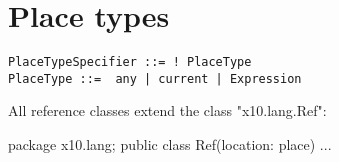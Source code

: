 

\section{Place types}\label{DepType:PlaceType}

\begin{verbatim}
PlaceTypeSpecifier ::= ! PlaceType
PlaceType ::=  any | current | Expression  
\end{verbatim}

All \Xten{} reference classes extend the class \xcd"x10.lang.Ref":

\begin{xten}
package x10.lang;
public class Ref(location: place) { ... }  
\end{xten}

